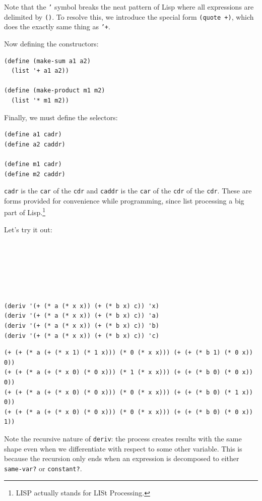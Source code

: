 \documentclass[9pt]{report}
\begin{document}
Note that the \texttt{'} symbol breaks the neat pattern of Lisp where all
expressions are delimited by \texttt{()}. To resolve this, we introduce
the special form \texttt{(quote +)}, which does the exactly same thing as
\texttt{'+}.

Now defining the constructors:

\begin{verbatim}
(define (make-sum a1 a2)
  (list '+ a1 a2))

(define (make-product m1 m2)
  (list '* m1 m2))
\end{verbatim}


Finally, we must define the selectors:

\begin{verbatim}
(define a1 cadr)
(define a2 caddr)

(define m1 cadr)
(define m2 caddr)
\end{verbatim}


\texttt{cadr} is the \texttt{car} of the \texttt{cdr} and \texttt{caddr} is the \texttt{car} of the
\texttt{cdr} of the \texttt{cdr}. These are forms provided for convenience while
programming, since list processing a big part of Lisp.\footnote{LISP actually stands for LISt Processing.}

Let's try it out:

\begin{verbatim}






(deriv '(+ (* a (* x x)) (+ (* b x) c)) 'x)
(deriv '(+ (* a (* x x)) (+ (* b x) c)) 'a)
(deriv '(+ (* a (* x x)) (+ (* b x) c)) 'b)
(deriv '(+ (* a (* x x)) (+ (* b x) c)) 'c)
\end{verbatim}

\begin{verbatim}
(+ (+ (* a (+ (* x 1) (* 1 x))) (* 0 (* x x))) (+ (+ (* b 1) (* 0 x)) 0))
(+ (+ (* a (+ (* x 0) (* 0 x))) (* 1 (* x x))) (+ (+ (* b 0) (* 0 x)) 0))
(+ (+ (* a (+ (* x 0) (* 0 x))) (* 0 (* x x))) (+ (+ (* b 0) (* 1 x)) 0))
(+ (+ (* a (+ (* x 0) (* 0 x))) (* 0 (* x x))) (+ (+ (* b 0) (* 0 x)) 1))
\end{verbatim}


Note the recursive nature of \texttt{deriv}: the process creates results
with the same shape even when we differentiate with respect to
some other variable. This is because the recursion only ends when
an expression is decomposed to either \texttt{same-var?} or \texttt{constant?}.
\end{document}
